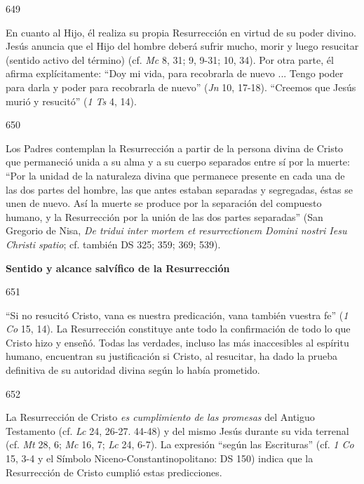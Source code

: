 			\begin{ccebody}\begin{ccenumber}649\end{ccenumber} En cuanto al Hijo, él realiza su propia Resurrección en virtud de su poder divino. Jesús anuncia que el Hijo del hombre deberá sufrir mucho, morir y luego resucitar (sentido activo del término) (cf. \textit{Mc} 8, 31; 9, 9-31; 10, 34). Por otra parte, él afirma explícitamente: “Doy mi vida, para recobrarla de nuevo ... Tengo poder para darla y poder para recobrarla de nuevo” (\textit{Jn }10, 17-18). “Creemos que Jesús murió y resucitó” (\textit{1 Ts} 4, 14).\end{ccebody}
			
			\begin{ccebody}\begin{ccenumber}650\end{ccenumber} Los Padres contemplan la Resurrección a partir de la persona divina de Cristo que permaneció unida a su alma y a su cuerpo separados entre sí por la muerte: “Por la unidad de la naturaleza divina que permanece presente en cada una de las dos partes del hombre, las que antes estaban separadas y segregadas, éstas se unen de nuevo. Así la muerte se produce por la separación del compuesto humano, y la Resurrección por la unión de las dos partes separadas” (San Gregorio de Nisa, \textit{De tridui inter mortem et resurrectionem Domini nostri Iesu Christi spatio}; cf. también DS 325; 359; 369; 539).\end{ccebody}
			
			\begin{ccebody}\textbf{Sentido y alcance salvífico de la Resurrección}\end{ccebody}
			
			\begin{ccebody}\begin{ccenumber}651\end{ccenumber} “Si no resucitó Cristo, vana es nuestra predicación, vana también vuestra fe” (\textit{1 Co} 15, 14). La Resurrección constituye ante todo la confirmación de todo lo que Cristo hizo y enseñó. Todas las verdades, incluso las más inaccesibles al espíritu humano, encuentran su justificación si Cristo, al resucitar, ha dado la prueba definitiva de su autoridad divina según lo había prometido.\end{ccebody}
			
			\begin{ccebody}\begin{ccenumber}652\end{ccenumber} La Resurrección de Cristo \textit{es cumplimiento de las promesas} del Antiguo Testamento (cf. \textit{Lc} 24, 26-27. 44-48) y del mismo Jesús durante su vida terrenal (cf. \textit{Mt} 28, 6; \textit{Mc} 16, 7; \textit{Lc} 24, 6-7). La expresión “según las Escrituras” (cf. \textit{1 Co} 15, 3-4 y el Símbolo Niceno-Constantinopolitano: DS 150) indica que la Resurrección de Cristo cumplió estas predicciones.\end{ccebody}
			
